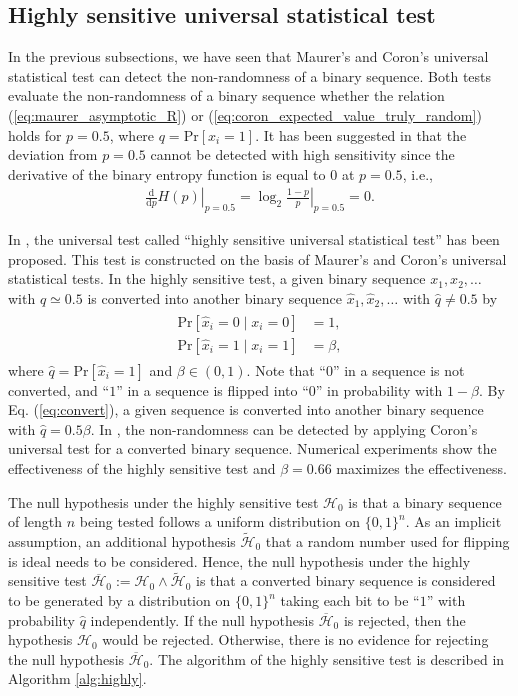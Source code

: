 \subsection{Highly sensitive universal statistical test}
In the previous subsections, we have seen that Maurer's and Coron's universal statistical test can detect the non-randomness of a binary sequence.
Both tests evaluate the non-randomness of a binary sequence whether the relation (\ref{eq:maurer_asymptotic_R}) or (\ref{eq:coron_expected_value_truly_random}) holds for $p=0.5$, where $q=\mathrm{Pr}[x_i=1]$. It has been suggested in \cite{yamamoto2016highly} that the deviation from $p=0.5$ cannot be detected with high sensitivity since the derivative of the binary entropy function is equal to $0$ at $p=0.5$, i.e.,
\begin{align}
  \left.\frac{\mathrm{d}}{\mathrm{d}p}H(p) \right|_{p=0.5} = \left.\log_2\frac{1-p}{p}\right|_{p=0.5} = 0.
\end{align}
\par
In \cite{yamamoto2016highly}, the universal test called ``highly sensitive universal statistical test'' has been proposed. This test is constructed on the basis of Maurer's and Coron's universal statistical tests.
%
In the highly sensitive test, a given binary sequence $x_1,x_2,\dots$ with $q \simeq 0.5$ is converted into another binary sequence $\hat{x}_1,\hat{x}_2,\dots$ with $\hat{q} \neq 0.5$ by
%
\begin{align}\label{eq:convert}
\begin{split}
  \mathrm{Pr}[\hat{x}_i = 0 \mid x_i=0] &= 1, \\
  \mathrm{Pr}[\hat{x}_i = 1 \mid x_i=1] &= \beta,
\end{split}
\end{align}
%
where $\hat{q}=\mathrm{Pr}[\hat{x}_i=1]$ and $\beta \in (0,1)$. Note that ``$0$'' in a sequence is not converted, and ``$1$'' in a sequence is flipped into ``$0$'' in probability with $1-\beta$. By Eq. (\ref{eq:convert}), a given sequence is converted into another binary sequence with $\hat{q}=0.5\beta$. In \cite{yamamoto2016highly}, the non-randomness can be detected by applying Coron's universal test for a converted binary sequence.
Numerical experiments show the effectiveness of the highly sensitive test and $\beta=0.66$ maximizes the effectiveness.
%
\par
The null hypothesis under the highly sensitive test $\mathcal{H}_0$ is that a binary sequence of length $n$ being tested follows a uniform distribution on $\{0,1\}^n$. As an implicit assumption, an additional hypothesis $\widetilde{\mathcal{H}}_0$ that a random number used for flipping is ideal needs to be considered. Hence, the null hypothesis under the highly sensitive test $\overline{\mathcal{H}}_0:=\mathcal{H}_0 \land \widetilde{\mathcal{H}}_0$ is that a converted binary sequence is considered to be generated by a distribution on $\{0,1\}^n$ taking each bit to be ``$1$'' with probability $\hat{q}$ independently. If the null hypothesis $\overline{\mathcal{H}}_0$ is rejected, then the hypothesis $\mathcal{H}_0$ would be rejected. Otherwise, there is no evidence for rejecting the null hypothesis $\overline{\mathcal{H}}_0$. The algorithm of the highly sensitive test is described in Algorithm \ref{alg:highly}.
